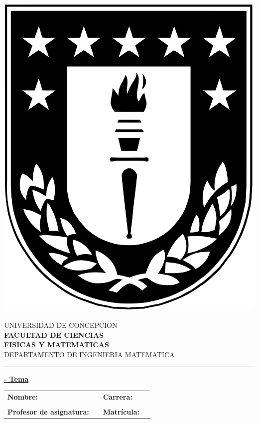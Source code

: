 \thispagestyle{empty}

\begin{minipage}{0.12\textwidth}
\includegraphics[width=\textwidth]{./img/logoudec.jpg}
\end{minipage}
\hspace{5mm}
\begin{minipage}{0.9\textwidth}
UNIVERSIDAD DE CONCEPCION\\
{\small\small\bf 
FACULTAD DE CIENCIAS\\ 
FISICAS Y MATEMATICAS}\\
DEPARTAMENTO DE INGENIERIA MATEMATICA\\
\rule{0.88\textwidth}{.5pt} %
\end{minipage}

\vspace*{0.5cm} \centerline {\bf\underline{\titulo - Tema \print{\thetemaCounter}}}
\centerline{\textrm{\fecha}}  \vspace{0.2cm}

\begin{centering}
\begin{tabular}{lp{}lp{}}
\textbf{Nombre:} 	& &\textbf{Carrera:}	& \\ \\
\textbf{Profesor de asignatura:}	& &\textbf{ Matr\'icula:}		&
\end{tabular}
\end{centering}

